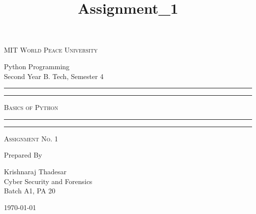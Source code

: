 \documentclass[11pt]{article}
\title{Assignment\_1}
\begin{document}
\begin{titlepage}
	\centering


	\huge\textsc{
		MIT World Peace University
	}\\

	\vspace{0.75\baselineskip} %

	\LARGE{
		Python Programming\\
		Second Year B. Tech, Semester 4
	}

	\vfill %


	\rule{\textwidth}{1.6pt}\vspace*{-\baselineskip}\vspace*{2pt}
	\rule{\textwidth}{0.6pt}
	\vspace{0.75\baselineskip} %



	\huge{\textsc{
			Basics of Python
		}} \\



	\vspace{0.5\baselineskip} %
	\rule{\textwidth}{0.6pt}\vspace*{-\baselineskip}\vspace*{2.8pt}
	\rule{\textwidth}{1.6pt}

	\vspace{1\baselineskip} %


	\LARGE\textsc{
		Assignment No. 1
	} %
	\vfill


	Prepared By
	\vspace{0.5\baselineskip} %

	\Large{
		Krishnaraj Thadesar \\
		Cyber Security and Forensics\\
		Batch A1, PA 20
	}


	\vspace{0.5\baselineskip} %
	\today

\end{titlepage}
\end{document}
